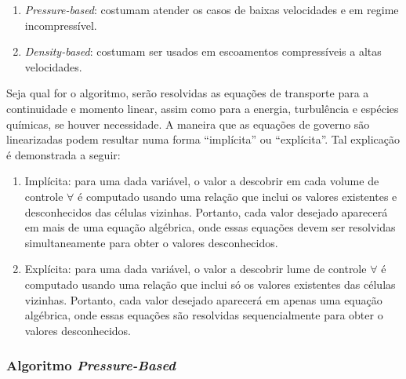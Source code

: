 \begin{enumerate}
    \item \textit{Pressure-based}: costumam atender os casos de baixas velocidades e em regime incompressível.
    \item \textit{Density-based}: costumam ser usados em escoamentos compressíveis a altas velocidades.
\end{enumerate}


Seja qual for o algoritmo, serão resolvidas as equações de transporte para a continuidade e momento linear, assim como para a energia, turbulência e espécies químicas, se houver necessidade. A maneira que as equações de governo são linearizadas podem resultar numa forma “implícita” ou “explícita”. Tal explicação é demonstrada a seguir:

\begin{enumerate}
    \item Implícita: para uma dada variável, o valor a descobrir em cada volume de controle \(\forall\) é computado usando uma relação que inclui os valores existentes e desconhecidos das células vizinhas. Portanto, cada valor desejado aparecerá em mais de uma equação algébrica, onde essas equações devem ser resolvidas simultaneamente para obter o valores desconhecidos.
    \item Explícita: para uma dada variável, o valor a descobrir lume de controle \(\forall\) é computado usando uma relação que inclui só os valores existentes das células vizinhas. Portanto, cada valor desejado aparecerá em apenas uma equação algébrica, onde essas equações são resolvidas sequencialmente para obter o valores desconhecidos. 
\end{enumerate}

\subsubsection{Algoritmo \textit{Pressure-Based}}

